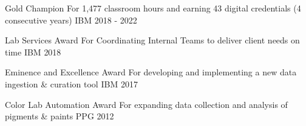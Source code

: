 

\begin{cvhonors}

  \cvhonor
    {Gold Champion} %
    {For 1,477 classroom hours and earning 43 digital credentials (4 consecutive years)} %
    {IBM} %
    {2018 - 2022} %

  \cvhonor
    {Lab Services Award} %
    {For Coordinating Internal Teams to deliver client needs on time} %
    {IBM} %
    {2018} %

%
  \cvhonor
    {Eminence and Excellence Award} %
    {For developing and implementing a new data ingestion \& curation tool} %
    {IBM} %
    {2017} %

  \cvhonor
    {Color Lab Automation Award} %
    {For expanding data collection and analysis of pigments \& paints}
    {PPG} %
    {2012} %

\end{cvhonors}
